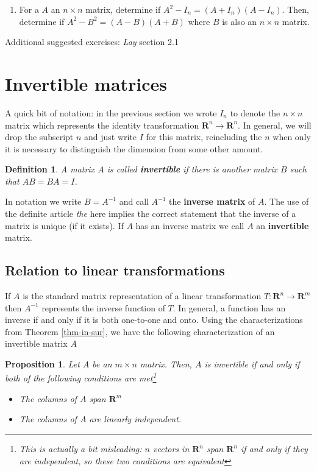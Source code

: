 \documentclass[12pt]{article}
\numberwithin{equation}{subsection}
\numberwithin{figure}{subsection}
\newtheorem{defn}[subsection]{Definition}
\newtheorem{prop}[subsection]{Proposition}
\theoremstyle{note}
\begin{document}
\begin{enumerate}[label=\arabic*.]
	\item For a $A$ an $n\times n$ matrix, determine if $A^2-I_n=(A+I_n)(A-I_n)$. Then, determine if $A^2-B^2=(A-B)(A+B)$ where $B$ is also an $n\times n$ matrix. 
	
	\end{enumerate}
	
Additional suggested exercises: \textit{Lay} section 2.1 


\section{Invertible matrices}

A quick bit of notation: in the previous section we wrote $I_n$ to denote the $n\times n$ matrix which represents the identity transformation $\mathbf{R}^n\to\mathbf{R}^n$. In general, we will drop the subscript $n$ and just write $I$ for this matrix, reincluding the $n$ when only it is necessary to distinguish the dimension from some other amount. 

\begin{defn}
	A matrix $A$ is called \textbf{invertible} if there is another matrix $B$ such that $AB=BA=I$. 
\end{defn}
In notation we write $B=A^{-1}$ and call $A^{-1}$ the \textbf{inverse matrix} of $A$. The use of the definite article \textit{the} here implies the correct statement that the inverse of a matrix is unique (if it exists). If $A$ has an inverse matrix we call $A$ an \textbf{invertible} matrix. 

\subsection{Relation to linear transformations}
If $A$ is the standard matrix representation of a linear transformation $T\colon \mathbf{R}^n\to \mathbf{R}^m$ then $A^{-1}$ represents the inverse function of $T$. In general, a function has an inverse if and only if it is both one-to-one and onto. Using the characterizations from Theorem \ref{thm-in-sur}, we have the following characterization of an invertible matrix $A$
\begin{prop} Let $A$ be an $m\times n$ matrix. Then, $A$ is invertible if and only if both of the following conditions are met\footnote{This is actually a bit misleading: $n$ vectors in $\mathbf{R}^n$ span $\mathbf{R}^n$ if and only if they are independent, so these two conditions are equivalent}
\begin{itemize}
	\item The columns of $A$ span $\mathbf{R}^m$
	\item The columns of $A$ are linearly independent.
\end{itemize} 
\end{prop}
\end{document}
